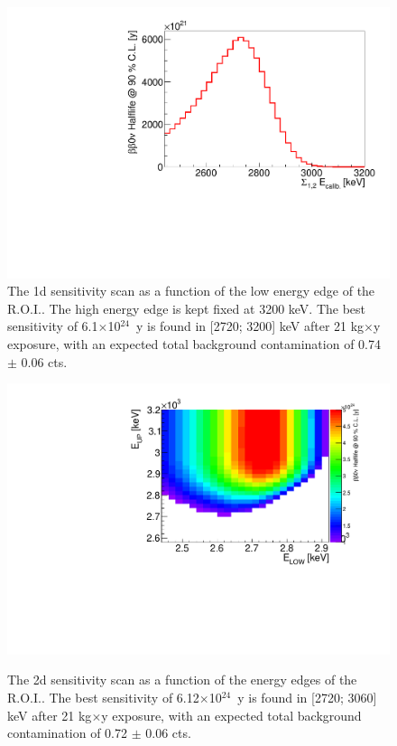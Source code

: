 \documentclass[main.tex]{subfiles}
\begin{document}
\begin{figure}[h!]
\centering
\includegraphics[scale=0.45]{pictures/Chap4/Sens1D.pdf}
\caption{The 1d sensitivity scan as a function of the low energy edge of the R.O.I.. The high energy edge is kept fixed at 3200 keV. The best sensitivity of 6.1$\times$10$^{\text{24}}$~y is found in [2720; 3200] keV after 21 kg$\times$y exposure, with an
expected total background contamination of 0.74 $\pm$ 0.06 cts.}
\label{Sens0nu1D}
\end{figure}


\begin{figure}[h!]
\centering
\includegraphics[scale=0.45]{pictures/Chap4/sens2D.pdf}
\label{Sens0nu2D.png}
\caption{The 2d sensitivity scan as a function of the energy edges of the R.O.I.. The best sensitivity of 6.12$\times$10$^{\text{24}}$~y is found in [2720; 3060] keV after 21 kg$\times$y exposure, with an expected total background contamination of 0.72 $\pm$ 0.06 cts.}
\end{figure}
\end{document}
